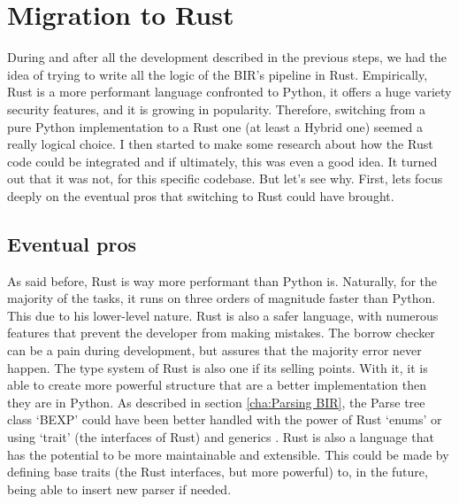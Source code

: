 \section{Migration to Rust}
\label{cha:Migration to Rust} During and after all the development described in
the previous steps, we had the idea of trying to write all the logic of the BIR's
pipeline in Rust. Empirically, Rust is a more performant language confronted to Python,
it offers a huge variety security features, and it is growing in popularity.
Therefore, switching from a pure Python implementation to a Rust one (at least a
Hybrid one) seemed a really logical choice. I then started to make some research
about how the Rust code could be integrated and if ultimately, this was even a good
idea. It turned out that it was not, for this specific codebase. But let's see
why. First, lets focus deeply on the eventual pros that switching to Rust could
have brought.

\subsection[Eventual pros]{Eventual pros}
As said before, Rust is way more performant than Python is. Naturally, for the majority
of the tasks, it runs on three orders of magnitude faster than Python. This due to
his lower-level nature. Rust is also a safer language, with numerous features that
prevent the developer from making mistakes. The borrow checker can be a pain
during development, but assures that the majority error never happen. The type
system of Rust is also one if its selling points. With it, it is able to create
more powerful structure that are a better implementation then they are in Python.
As described in section \ref{cha:Parsing BIR}, the Parse tree class `BEXP' could
have been better handled with the power of Rust `enums' or using `trait' (the interfaces
of Rust) and generics . Rust is also a language that has the potential to be
more maintainable and extensible. This could be made by defining base traits (the
Rust interfaces, but more powerful) to, in the future, being able to insert new
parser if needed.

